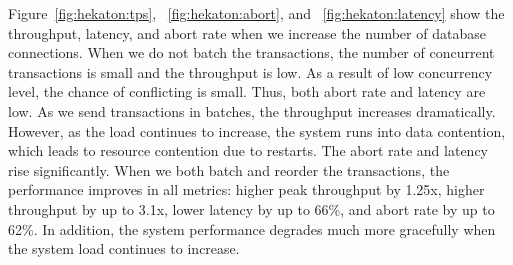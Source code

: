 Figure~\ref{fig:hekaton:tps}, ~\ref{fig:hekaton:abort}, and ~\ref{fig:hekaton:latency} show the throughput, latency, and abort rate when we increase the number of database connections. When we do not batch the transactions, the number of concurrent transactions is small and the throughput is low. As a result of low concurrency level, the chance of conflicting is small. Thus, both abort rate and latency are low. As we send transactions in batches, the throughput increases dramatically. However, as the load continues to increase, the system runs into data contention, which leads to resource contention due to restarts. The abort rate and latency rise significantly. When we both batch and reorder the transactions, the performance improves in all metrics: higher peak throughput by 1.25x, higher throughput by up to 3.1x, lower latency by up to 66\%, and abort rate by up to 62\%. In addition, the system performance degrades much more gracefully when the system load continues to increase.
